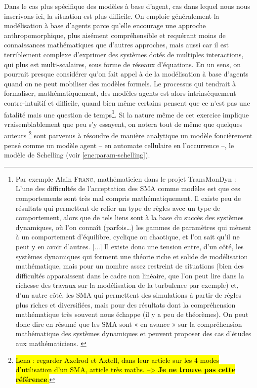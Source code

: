 Dans le cas plus spécifique des modèles à base d'agent, cas dans lequel nous nous inscrivons ici, la situation est plus difficile.
On emploie généralement la modélisation à base d'agents parce qu'elle encourage une approche anthropomorphique, plus aisément compréhensible et requérant moins de connaissances mathématiques que d'autres approches, mais aussi car il est terriblement complexe d'exprimer des systèmes dotés de multiples interactions, qui plus est multi-scalaires, sous forme de réseaux d'équations.
En un sens, on pourrait presque considérer qu'on fait appel à de la modélisation à base d'agents quand on ne peut mobiliser des modèles formels.
Le processus qui tendrait à formaliser, mathématiquement, des modèles agents est alors intrinsèquement contre-intuitif et difficile, quand bien même certains pensent que ce n'est pas une fatalité mais une question de temps\footnote{
	Par exemple Alain \textsc{Franc}, mathématicien dans le projet TransMonDyn :
	\og L’une des difficultés de l’acceptation des SMA comme modèles est que ces comportements sont très mal compris mathématiquement.
	Il existe peu de résultats qui permettent de relier un type de règles avec un type de comportement, alors que de tels liens sont à la base du succès des systèmes dynamiques, où l’on connaît (parfois\ldots) les gammes de paramètres qui mènent à un comportement d’équilibre, cyclique ou chaotique, et l’on sait qu’il ne peut y en avoir d’autres.
	[...]
	Il existe donc une tension entre, d’un côté, les systèmes dynamiques qui forment une théorie riche et solide de modélisation mathématique, mais pour un nombre assez restreint de situations (bien des difficultés apparaissent dans le cadre non linéaire, que l’on peut lire dans la richesse des travaux sur la modélisation de la turbulence par exemple) et, d’un autre côté, les SMA qui permettent des simulations à partir de règles plus riches et diversifiées, mais pour des résultats dont la compréhension mathématique très souvent nous échappe (il y a peu de théorèmes).
	On peut donc dire en résumé que les SMA sont « en avance » sur la compréhension mathématique des systèmes dynamiques et peuvent proposer des cas d’études aux mathématiciens.\fg{}
	\autocite[Annexe 2, \og Retour sur les SMA comme outil et cadre conceptuel de modélisation.\fg{}, pp. 479-482 ]{ouriachi_lelaboration_2018}
}.
Si la nature même de cet exercice implique vraisemblablement que peu s'y essayent, on notera tout de même que quelques auteurs \autocite{zhang_tipping_2011,grauwin_dynamic_2012}\footnote{
	\hl{Lena : regarder Axelrod et Axtell, dans leur article sur les 4 modes d'utilisation d'un SMA, article très maths. --> \textbf{Je ne trouve pas cette référence}.}
} sont parvenus à résoudre de manière analytique un modèle foncièrement pensé comme un modèle agent -- en automate cellulaire en l'occurrence --, le modèle de Schelling (voir \cref{enc:param-schelling}).
